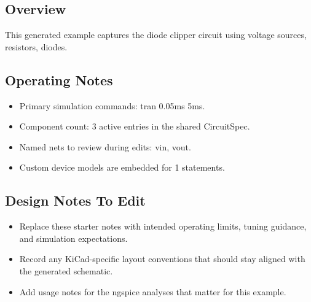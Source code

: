 \subsection*{Overview}
This generated example captures the diode clipper circuit using voltage sources, resistors, diodes.

\subsection*{Operating Notes}
\begin{itemize}
  \item Primary simulation commands: tran 0.05ms 5ms.
  \item Component count: 3 active entries in the shared CircuitSpec.
  \item Named nets to review during edits: vin, vout.
  \item Custom device models are embedded for 1 statements.
\end{itemize}
\subsection*{Design Notes To Edit}
\begin{itemize}
  \item Replace these starter notes with intended operating limits, tuning guidance, and simulation expectations.
  \item Record any KiCad-specific layout conventions that should stay aligned with the generated schematic.
  \item Add usage notes for the ngspice analyses that matter for this example.
\end{itemize}

